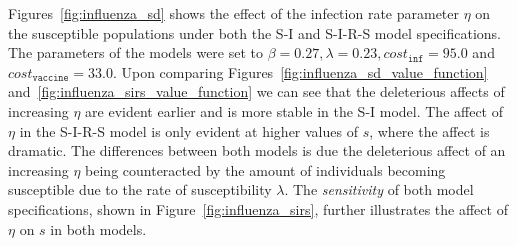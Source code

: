 Figures~\ref{fig:influenza_sd} shows the effect of the infection rate parameter {\footnotesize $\eta$} on the susceptible populations under both the S-I and S-I-R-S model specifications. The parameters of the models were set to {\footnotesize$ \beta = 0.27, \lambda = 0.23, cost_{\mathtt{inf}} = 95.0$} and {\footnotesize$cost_{\mathtt{vaccine}} = 33.0$}. Upon comparing Figures~\ref{fig:influenza_sd_value_function}
and~\ref{fig:influenza_sirs_value_function} we can see that the deleterious affects of increasing {\footnotesize $\eta$} are evident earlier and is more stable in the S-I model. The affect of {\footnotesize $\eta$} in the S-I-R-S model is only evident at higher values of {\footnotesize $s$}, where the affect is dramatic. The differences between both models is due the deleterious affect of an increasing {\footnotesize $ \eta $} being counteracted by the amount of individuals becoming susceptible due to the rate of susceptibility {\footnotesize $ \lambda $}. The \textit{sensitivity} of both model specifications, shown in Figure~\ref{fig:influenza_sirs}, further illustrates the affect of {\footnotesize $\eta$} on {\footnotesize $s$} in both models. 

